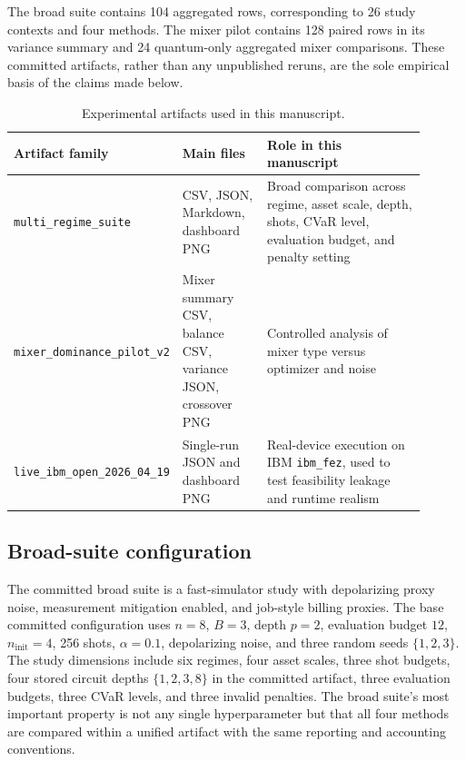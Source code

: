 \documentclass[11pt]{article}
\begin{document}
The broad suite contains 104 aggregated rows, corresponding to 26 study contexts and four methods. The mixer pilot contains 128 paired rows in its variance summary and 24 quantum-only aggregated mixer comparisons. These committed artifacts, rather than any unpublished reruns, are the sole empirical basis of the claims made below.

\begin{table}[H]
\centering
\caption{Experimental artifacts used in this manuscript.}
\label{tab:artifacts}
\begin{tabular}{p{0.27\linewidth}p{0.21\linewidth}p{0.42\linewidth}}
\toprule
Artifact family & Main files & Role in this manuscript \\
\midrule
\texttt{multi\_regime\_suite} & CSV, JSON, Markdown, dashboard PNG & Broad comparison across regime, asset scale, depth, shots, CVaR level, evaluation budget, and penalty setting \\
\texttt{mixer\_dominance\_pilot\_v2} & Mixer summary CSV, balance CSV, variance JSON, crossover PNG & Controlled analysis of mixer type versus optimizer and noise \\
\texttt{live\_ibm\_open\_2026\_04\_19} & Single-run JSON and dashboard PNG & Real-device execution on IBM \texttt{ibm\_fez}, used to test feasibility leakage and runtime realism \\
\bottomrule
\end{tabular}
\end{table}

\subsection{Broad-suite configuration}

The committed broad suite is a fast-simulator study with depolarizing proxy noise, measurement mitigation enabled, and job-style billing proxies. The base committed configuration uses \(n=8\), \(B=3\), depth \(p=2\), evaluation budget \(12\), \(n_{\mathrm{init}}=4\), 256 shots, \(\alpha=0.1\), depolarizing noise, and three random seeds \(\{1,2,3\}\). The study dimensions include six regimes, four asset scales, three shot budgets, four stored circuit depths \(\{1,2,3,8\}\) in the committed artifact, three evaluation budgets, three CVaR levels, and three invalid penalties. The broad suite's most important property is not any single hyperparameter but that all four methods are compared within a unified artifact with the same reporting and accounting conventions.
\end{document}
